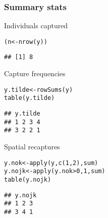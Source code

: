 \documentclass[color=usenames,dvipsnames]{beamer}\usepackage[]{graphicx}\usepackage[]{color}
\makeatletter
\newcommand{\hlnum}[1]{\textcolor[rgb]{0.69,0.494,0}{#1}}%
\newcommand{\hlopt}[1]{\textcolor[rgb]{0,0,0}{#1}}%
\newcommand{\hlstd}[1]{\textcolor[rgb]{0,0,0}{#1}}%
\newcommand{\hlkwb}[1]{\textcolor[rgb]{0,0.341,0.682}{#1}}%
\newcommand{\hlkwd}[1]{\textcolor[rgb]{0.004,0.004,0.506}{#1}}%
\newenvironment{kframe}{%
 \def\at@end@of@kframe{}%
 \ifinner\ifhmode%
  \def\at@end@of@kframe{\end{minipage}}%
  \begin{minipage}{\columnwidth}%
 \fi\fi%
 \def\FrameCommand##1{\hskip\@totalleftmargin \hskip-\fboxsep
 \colorbox{shadecolor}{##1}\hskip-\fboxsep
     \hskip-\linewidth \hskip-\@totalleftmargin \hskip\columnwidth}%
 \MakeFramed {\advance\hsize-\width
   \@totalleftmargin\z@ \linewidth\hsize
   \@setminipage}}%
 {\par\unskip\endMakeFramed%
 \at@end@of@kframe}
\newenvironment{knitrout}{}{} %
\makeatother
\begin{document}
\begin{frame}[fragile]
  \frametitle{Summary stats}
  \small
  Individuals captured
\begin{knitrout}\footnotesize
{}\color{fgcolor}\begin{kframe}
\begin{alltt}
\hlstd{(n} \hlkwb{<-} \hlkwd{nrow}\hlstd{(y))}
\end{alltt}
\begin{verbatim}
## [1] 8
\end{verbatim}
\end{kframe}
\end{knitrout}
\pause \vfill
  Capture frequencies
  \vspace{-6pt}  
\begin{knitrout}\footnotesize
{}\color{fgcolor}\begin{kframe}
\begin{alltt}
\hlstd{y.tilde} \hlkwb{<-} \hlkwd{rowSums}\hlstd{(y)}
\hlkwd{table}\hlstd{(y.tilde)}
\end{alltt}
\begin{verbatim}
## y.tilde
## 1 2 3 4 
## 3 2 2 1
\end{verbatim}
\end{kframe}
\end{knitrout}
\pause
\vfill
Spatial recaptures
  \vspace{-6pt}  
\begin{knitrout}\footnotesize
{}\color{fgcolor}\begin{kframe}
\begin{alltt}
\hlstd{y.nok} \hlkwb{<-} \hlkwd{apply}\hlstd{(y,} \hlkwd{c}\hlstd{(}\hlnum{1}\hlstd{,} \hlnum{2}\hlstd{), sum)}
\hlstd{y.nojk} \hlkwb{<-} \hlkwd{apply}\hlstd{(y.nok}\hlopt{>}\hlnum{0}\hlstd{,} \hlnum{1}\hlstd{, sum)}
\hlkwd{table}\hlstd{(y.nojk)}
\end{alltt}
\begin{verbatim}
## y.nojk
## 1 2 3 
## 3 4 1
\end{verbatim}
\end{kframe}
\end{knitrout}
\end{frame}
\end{document}
